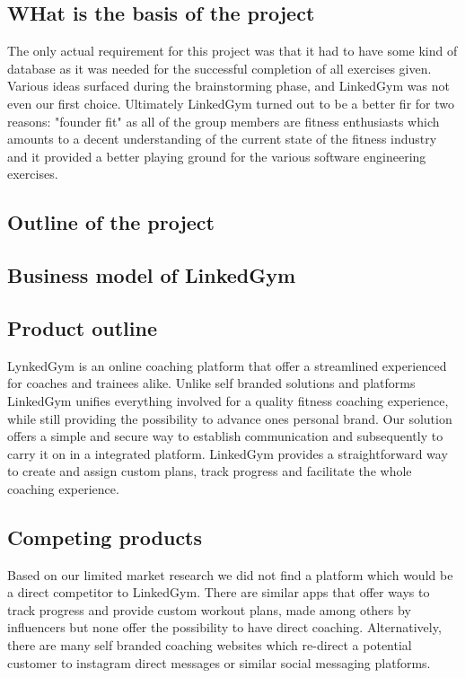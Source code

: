\subsection{WHat is the basis of the project}

The only actual requirement for this project was that it had to have some kind of database as it was needed for the successful completion of all exercises given.
Various ideas surfaced during the brainstorming phase, and LinkedGym was not even our first choice. Ultimately LinkedGym turned out to be a better fir for two reasons: "founder fit" as all of the group members are fitness enthusiasts which amounts to a decent understanding of the current state of the fitness industry and it provided a better playing ground for the various software engineering exercises.

\subsection{Outline of the project}

\subsection{Business model of LinkedGym}

\subsection{Product outline}

LynkedGym is an online coaching platform that offer a streamlined experienced for coaches and trainees alike. Unlike self branded solutions and platforms LinkedGym unifies everything involved for a quality fitness coaching experience, while still providing the possibility to advance ones personal brand. Our solution offers a simple and secure way to establish communication and subsequently to carry it on in a integrated platform. LinkedGym provides a straightforward way to create and assign custom plans, track progress and facilitate the whole coaching experience.

\subsection{Competing products}

Based on our limited market research we did not find a platform which would be a direct competitor to LinkedGym. There are similar apps that offer ways to track progress and provide custom workout plans, made among others by influencers but none offer the possibility to have direct coaching. Alternatively, there are many self branded coaching websites which re-direct a potential customer to instagram direct messages or similar social messaging platforms.

